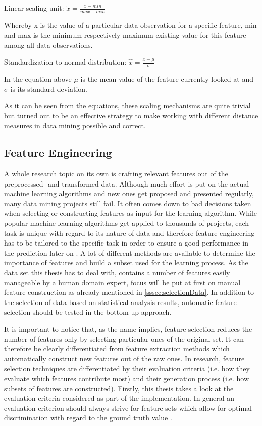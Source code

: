 Linear scaling unit: $\tilde{x} = \frac{x - min}{max - min}$

Whereby x is the value of a particular data observation for a specific feature, min and max is the minimum respectively maximum existing value for this feature among all data observations. 

Standardization to normal distribution: $\hat{x} = \frac{x - \mu}{\sigma}$

In the equation above $\mu$ is the mean value of the feature currently looked at and $\sigma$ is its standard deviation.

As it can be seen from the equations, these scaling mechanisms are quite trivial but turned out to be an effective strategy to make working with different distance measures in data mining possible and correct.

\subsection{Feature Engineering}
\label{sssec:featureEngineering}
A whole research topic on its own is crafting relevant features out of the preprocessed- and transformed data. Although much effort is put on the actual machine learning algorithms and new ones get proposed and presented regularly, many data mining projects still fail. It often comes down to bad decisions taken when selecting or constructing features as input for the learning algorithm. While popular machine learning algorithms get applied to thousands of projects, each task is unique with regard to its nature of data and therefore feature engineering has to be tailored to the specific task in order to ensure a good performance in the prediction later on \cite{domingos2012few}. A lot of different methods are available to determine the importance of features and build a subset used for the learning process. As the data set this thesis has to deal with, contains a number of features easily manageable by a human domain expert, focus will be put at first on manual feature construction as already mentioned in \ref{sssec:selectionData}. In addition to the selection of data based on statistical analysis results, automatic feature selection should be tested in the bottom-up approach. 

It is important to notice that, as the name implies, feature selection reduces the number of features only by selecting particular ones of the original set. It can therefore be clearly differentiated from feature extraction methods which automatically construct new features out of the raw ones. In research, feature selection techniques are differentiated by their evaluation criteria (i.e. how they evaluate which features contribute most) and their generation process (i.e. how subsets of features are constructed). Firstly, this thesis takes a look at the evaluation criteria considered as part of the implementation. In general an evaluation criterion should always strive for feature sets which allow for optimal discrimination with regard to the ground truth value \cite{dash1997feature}. 

